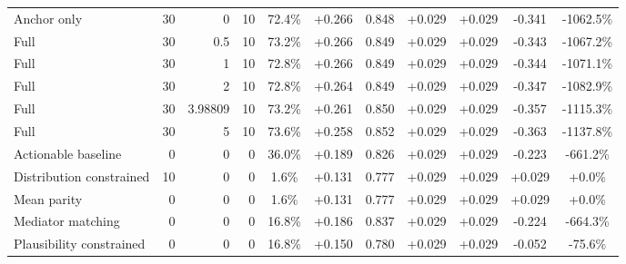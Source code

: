\begin{table}[htbp]
\begin{tabular}{lrrrccccccc}
Anchor only & 30 & 0 & 10 & 72.4\% & +0.266 & 0.848 & +0.029 & +0.029 & -0.341 & -1062.5\% \\
Full & 30 & 0.5 & 10 & 73.2\% & +0.266 & 0.849 & +0.029 & +0.029 & -0.343 & -1067.2\% \\
Full & 30 & 1 & 10 & 72.8\% & +0.266 & 0.849 & +0.029 & +0.029 & -0.344 & -1071.1\% \\
Full & 30 & 2 & 10 & 72.8\% & +0.264 & 0.849 & +0.029 & +0.029 & -0.347 & -1082.9\% \\
Full & 30 & 3.98809 & 10 & 73.2\% & +0.261 & 0.850 & +0.029 & +0.029 & -0.357 & -1115.3\% \\
Full & 30 & 5 & 10 & 73.6\% & +0.258 & 0.852 & +0.029 & +0.029 & -0.363 & -1137.8\% \\
Actionable baseline & 0 & 0 & 0 & 36.0\% & +0.189 & 0.826 & +0.029 & +0.029 & -0.223 & -661.2\% \\
Distribution constrained & 10 & 0 & 0 & 1.6\% & +0.131 & 0.777 & +0.029 & +0.029 & +0.029 & +0.0\% \\
Mean parity & 0 & 0 & 0 & 1.6\% & +0.131 & 0.777 & +0.029 & +0.029 & +0.029 & +0.0\% \\
Mediator matching & 0 & 0 & 0 & 16.8\% & +0.186 & 0.837 & +0.029 & +0.029 & -0.224 & -664.3\% \\
Plausibility constrained & 0 & 0 & 0 & 16.8\% & +0.150 & 0.780 & +0.029 & +0.029 & -0.052 & -75.6\% \\
\bottomrule
\end{tabular}
\end{table}
